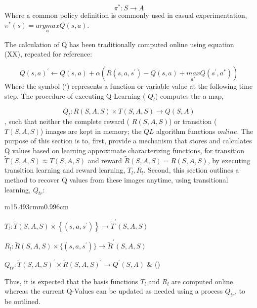 \documentclass{article}
\makeatletter
\newcommand\arraybslash{\let\\\@arraycr}
\newcounter{Equation}
\renewcommand\theEquation{\arabic{Equation}}
\makeatother
\begin{document}
\begin{equation}
\pi ^{\ast }:S\rightarrow A
\end{equation}
Where a common policy definition is commonly used in casual experimentation,  $\pi ^{\ast }(s)=\underset a{\mathit{argmax}}Q(s,a)$.

The calculation of Q has been traditionally computed online using equation (XX), repeated for reference:

\begin{equation}
Q(s,a)^'\leftarrow Q(s,a)+\alpha \left(R\left(s,a,s^'\right)-Q\left(s,a\right)+\underset{a^{\ast }}{\mathit{max}}Q(s^',a^{\ast })\right)
\end{equation}
Where the symbol (`) represents a function or variable value at the following time step. The procedure of executing Q-Learning ( $Q_l$) computes the a map,

\begin{equation}
Q_l:R(S,A,S)\times T(S,A,S)\rightarrow Q(S,A)
\end{equation}
, such that neither the complete reward ( $R(S,A,S)$) or transition ( $T(S,A,S)$) images are kept in memory; the  $\mathit{QL}$ algorithm functions  $\mathit{online}$. The purpose of this section is to, first, provide a mechanism that stores and calculates Q values based on learning approximate characterizing functions, for transition  $\widetilde T(S,A,S){\approx}T(S,A,S)$ and reward  $\widetilde R\left(S,A,S\right)=R(S,A,S)$, by executing transition learning and reward learning,  $T_l,R_l$. Second, this section outlines a method to recover Q values from these images anytime, using transitional learning,  $Q_{\mathit{tr}}$:

\begin{flushleft}
\tablefirsthead{}
\tablehead{}
\tabletail{}
\tablelasttail{}
\begin{supertabular}{m{15.493cm}m{0.996cm}}
{\centering  $T_l:\widetilde T\left(S,A,S\right)\times \left\{\left(s,a,s^'\right)\right\}\rightarrow \widetilde T^'(S,A,S)$\par}

{\centering  $R_l:\widetilde R\left(S,A,S\right)\times \{(s,a,s^')\}\rightarrow \widetilde R^'(S,A,S)$\par}

\centering  $Q_{\mathit{tr}}:\widetilde T(S,A,S)^'\times \widetilde R(S,A,S)^'\rightarrow Q^'(S,A)$ &
\centering\arraybslash (\stepcounter{Equation}{\theEquation})\\
\end{supertabular}
\end{flushleft}
Thus, it is expected that the basis functions  $T_l$ and  $R_l$ are computed online, whereas the current Q-Values can be updated as needed using a process  $Q_{\mathit{tr}}$, to be outlined. 
\end{document}
